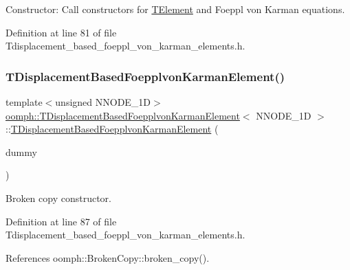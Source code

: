 Constructor\+: Call constructors for \hyperlink{classoomph_1_1TElement}{T\+Element} and Foeppl von Karman equations. 



Definition at line 81 of file Tdisplacement\+\_\+based\+\_\+foeppl\+\_\+von\+\_\+karman\+\_\+elements.\+h.

\mbox{\label{classoomph_1_1TDisplacementBasedFoepplvonKarmanElement_a4ea3b406605215c3254b9cfbcdbdbba8}} 
\subsubsection{\texorpdfstring{T\+Displacement\+Based\+Foepplvon\+Karman\+Element()}{TDisplacementBasedFoepplvonKarmanElement()}\hspace{0.1cm}{\footnotesize\ttfamily [2/2]}}
{\footnotesize\ttfamily template$<$unsigned N\+N\+O\+D\+E\+\_\+1D$>$ \\
\hyperlink{classoomph_1_1TDisplacementBasedFoepplvonKarmanElement}{oomph\+::\+T\+Displacement\+Based\+Foepplvon\+Karman\+Element}$<$ N\+N\+O\+D\+E\+\_\+1D $>$\+::\hyperlink{classoomph_1_1TDisplacementBasedFoepplvonKarmanElement}{T\+Displacement\+Based\+Foepplvon\+Karman\+Element} (\begin{DoxyParamCaption}\item[{const \hyperlink{classoomph_1_1TDisplacementBasedFoepplvonKarmanElement}{T\+Displacement\+Based\+Foepplvon\+Karman\+Element}$<$ N\+N\+O\+D\+E\+\_\+1D $>$ \&}]{dummy }\end{DoxyParamCaption})\hspace{0.3cm}{\ttfamily [inline]}}



Broken copy constructor. 



Definition at line 87 of file Tdisplacement\+\_\+based\+\_\+foeppl\+\_\+von\+\_\+karman\+\_\+elements.\+h.



References oomph\+::\+Broken\+Copy\+::broken\+\_\+copy().



